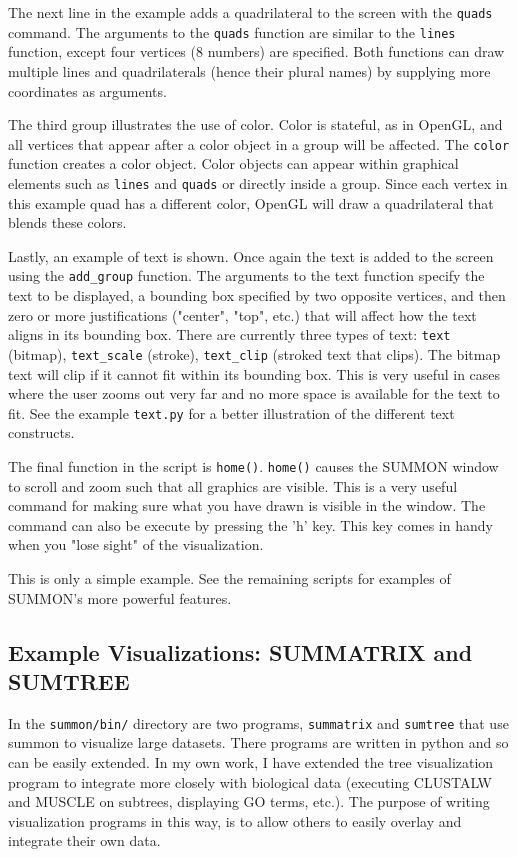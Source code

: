 \documentclass[12pt]{article}
\newcommand{\code}[1]{{\tt #1}}
\begin{document}
The next line in the example adds a quadrilateral to the screen with the
\code{quads} command.  The arguments to the \code{quads} function are similar to
the \code{lines} function, except four vertices (8 numbers) are specified.  Both
functions can draw multiple lines and quadrilaterals (hence their plural names)
by supplying more coordinates as arguments.

The third group illustrates the use of color.  Color is stateful, as in OpenGL,
and all vertices that appear after a color object in a group will be affected. 
The \code{color} function creates a color object.  Color objects can appear
within graphical elements such as \code{lines} and \code{quads} or directly
inside a group.  Since each vertex in this example quad has a different color,
OpenGL will draw a quadrilateral that blends these colors.

Lastly, an example of text is shown.  Once again the text is added to the screen
using the \code{add\_group} function.  The arguments to the text function
specify the text to be displayed, a bounding box specified by two
opposite  vertices, and then zero or more justifications ("center", "top",
etc.) that will affect how the text aligns in its bounding box.  There are
currently three types of text: \code{text} (bitmap), \code{text\_scale} (stroke),
\code{text\_clip} (stroked text that clips).  The bitmap text will clip if it
cannot fit within its bounding box.  This is very useful in cases where the user
zooms out very far and no more space is available for the text to fit.  See the
example \code{text.py} for a better illustration of the different text
constructs.

The final function in the script is \code{home()}.  \code{home()} causes the
SUMMON window to scroll and zoom such that all graphics are visible.  This is a
very useful command for making sure what you have drawn is visible in the
window.  The command can also be execute by pressing the 'h' key.  This key 
comes in handy when you "lose sight" of the visualization.

This is only a simple example.  See the remaining scripts for examples of
SUMMON's more powerful features.

\subsection{Example Visualizations: SUMMATRIX and SUMTREE}

In the \code{summon/bin/} directory are two programs, \code{summatrix} and
\code{sumtree} that use summon to visualize large datasets.  There programs are
written in python and so can be easily extended.  In my own work, I have 
extended the tree visualization program to integrate more closely with biological
data (executing CLUSTALW and MUSCLE on subtrees, displaying GO terms, etc.).  The
purpose of writing visualization programs in this way, is to allow others to
easily overlay and integrate their own data.  
\end{document}
